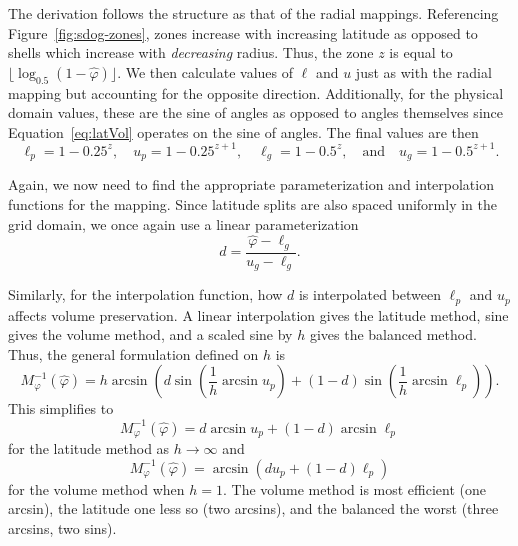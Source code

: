 The derivation follows the structure as that of the radial mappings.
Referencing Figure~\ref{fig:sdog-zones}, zones increase with increasing latitude as opposed to shells which increase with \textit{decreasing} radius.
Thus, the zone $z$ is equal to $\lfloor \log_{0.5} ( 1 - \hat{\varphi} ) \rfloor$.
We then calculate values of $\ell$ and $u$ just as with the radial mapping but accounting for the opposite direction.
Additionally, for the physical domain values, these are the sine of angles as opposed to angles themselves since Equation~\ref{eq:latVol} operates on the sine of angles.
The final values are then
%
\begin{equation*}
\ell_p = 1 - 0.25^{z}, \quad u_p = 1 - 0.25^{z + 1}, \quad \ell_g = 1 - 0.5^z, \quad \text{and} \quad u_g = 1 - 0.5^{z + 1}.
\end{equation*}
%

Again, we now need to find the appropriate parameterization and interpolation functions for the mapping.
Since latitude splits are also spaced uniformly in the grid domain, we once again use a linear parameterization
%
\begin{equation} \label{eq:latInvD}
d = \frac{ \hat{\varphi} - \ell_g }{ u_g - \ell_g }.
\end{equation}
%

Similarly, for the interpolation function, how $d$ is interpolated between $\ell_p$ and $u_p$ affects volume preservation.
A linear interpolation gives the latitude method, sine gives the volume method, and a scaled sine by $h$ gives the balanced method.
Thus, the general formulation defined on $h$ is
%
\begin{equation} \label{eq:latInv}
M_\varphi^{-1}(\hat{\varphi}) = h \arcsin \left( d \sin \left( \frac{1}{h} \arcsin u_p \right) + \left( 1 - d \right) \sin \left( \frac{1}{h} \arcsin \ell_p \right) \right).
\end{equation}
%
This simplifies to
%
\begin{equation*}
M_\varphi^{-1}(\hat{\varphi}) = d \arcsin u_p  + \left( 1 - d \right) \arcsin \ell_p
\end{equation*}
%
for the latitude method as $h \rightarrow \infty$ and
%
\begin{equation*}
M_\varphi^{-1}(\hat{\varphi}) = \arcsin \left( d u_p + \left( 1 - d \right) \ell_p \right)
\end{equation*}
%
for the volume method when $h = 1$.
The volume method is most efficient (one arcsin), the latitude one less so (two arcsins), and the balanced the worst (three arcsins, two sins).


